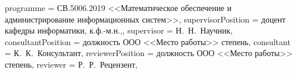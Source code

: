 {    %
    programme          = {СВ.5006.2019 <<Математическое обеспечение и администрирование информационных систем>>},
    supervisorPosition = {доцент кафедры информатики, к.ф.-м.н.,}, %
    supervisor         = {Н.~Н.~Научник},
    consultantPosition = {должность ООО <<Место работы>> степень},
    consultant         = {К.~К.~Консультант},
    reviewerPosition   = {должность ООО <<Место работы>> степень},
    reviewer           = {Р.~Р.~Рецензент},
}

